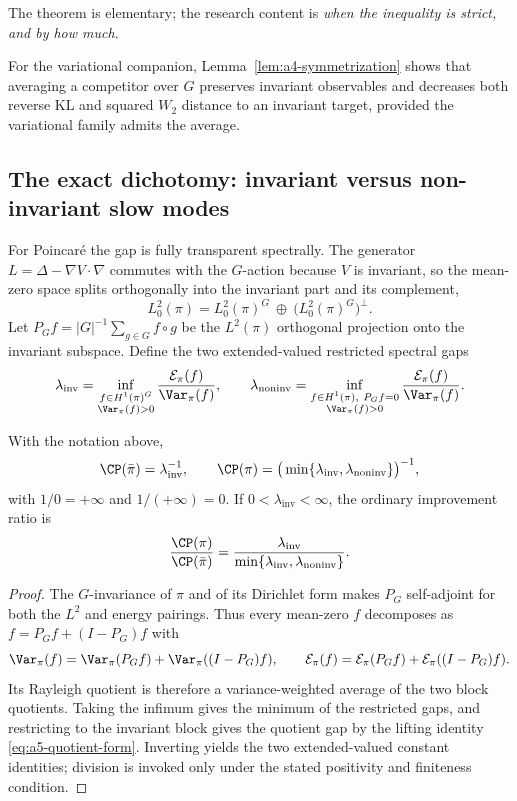 \documentclass[../../main.tex]{subfiles}
\begin{document}
\noindent The theorem is elementary; the research content is \emph{when the inequality is
strict, and by how much}.

For the variational companion, Lemma~\ref{lem:a4-symmetrization} shows that averaging a competitor
over $G$ preserves invariant observables and decreases both reverse KL and squared $W_2$ distance
to an invariant target, provided the variational family admits the average.

\subsection{The exact dichotomy: invariant versus non-invariant slow modes}
\label{subsec:a5-spectral}

For Poincar\'e the gap is fully transparent spectrally. The generator
$L=\Delta-\nabla V\cdot\nabla$ commutes with the $G$-action because $V$ is invariant, so the
mean-zero space splits orthogonally into the invariant part and its complement,
\[
  L^2_0(\pi)=L^2_0(\pi)^G\ \oplus\ \big(L^2_0(\pi)^G\big)^\perp .
\]
Let $P_Gf=|G|^{-1}\sum_{g\in G}f\circ g$ be the $L^2(\pi)$ orthogonal projection onto the
invariant subspace. Define the two extended-valued restricted spectral gaps
\[
  \lambda_{\mathrm{inv}}=\inf_{\substack{f\in H^1(\pi)^G\\\Var_\pi(f)>0}}\frac{\mathcal E_\pi(f)}{\Var_\pi(f)},
  \qquad
  \lambda_{\mathrm{noninv}}=\inf_{\substack{f\in H^1(\pi),\ P_Gf=0\\\Var_\pi(f)>0}}
  \frac{\mathcal E_\pi(f)}{\Var_\pi(f)} .
\]

\begin{proposition}
\label{prop:a5-ratio}
With the notation above,
\[
  \CP(\bar\pi)=\lambda_{\mathrm{inv}}^{-1},
  \qquad
  \CP(\pi)=\big(\min\{\lambda_{\mathrm{inv}},\lambda_{\mathrm{noninv}}\}\big)^{-1},
\]
with $1/0=+\infty$ and $1/(+\infty)=0$. If $0<\lambda_{\mathrm{inv}}<\infty$, the ordinary improvement ratio is
\[
  \frac{\CP(\pi)}{\CP(\bar\pi)}=\frac{\lambda_{\mathrm{inv}}}{\min\{\lambda_{\mathrm{inv}},\lambda_{\mathrm{noninv}}\}} .
\]
\end{proposition}

\begin{proof}
The $G$-invariance of $\pi$ and of its Dirichlet form makes $P_G$ self-adjoint for both the
$L^2$ and energy pairings. Thus every mean-zero $f$ decomposes as
$f=P_Gf+(I-P_G)f$ with
\[
 \Var_\pi(f)=\Var_\pi(P_Gf)+\Var_\pi((I-P_G)f),\qquad
 \mathcal E_\pi(f)=\mathcal E_\pi(P_Gf)+\mathcal E_\pi((I-P_G)f).
\]
Its Rayleigh quotient is therefore a variance-weighted average of the two block quotients. Taking
the infimum gives the minimum of the restricted gaps, and restricting to the invariant block gives
the quotient gap by the lifting identity \eqref{eq:a5-quotient-form}. Inverting yields the two
extended-valued constant identities; division is invoked only under the stated positivity and
finiteness condition.
\end{proof}
\end{document}
